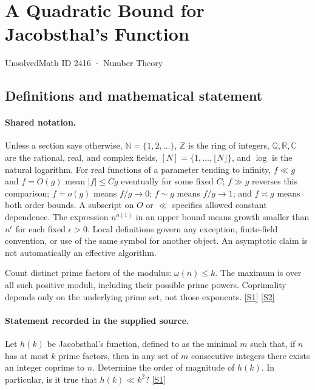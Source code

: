\documentclass[11pt,a4paper]{article}
\newcommand{\N}{\mathbb{N}}
\newcommand{\Z}{\mathbb{Z}}
\newcommand{\Q}{\mathbb{Q}}
\newcommand{\R}{\mathbb{R}}
\newcommand{\C}{\mathbb{C}}
\newcommand{\sref}[2]{\hyperlink{source:#1:#2}{[S#2]}}
\begin{document}

\setcounter{section}{2415}

\section{A Quadratic Bound for Jacobsthal's Function}\label{2416}

{\small\sffamily UnsolvedMath ID 2416 · Number Theory}

\subsection{Definitions and mathematical statement}

\paragraph{Shared notation.}Unless a section says otherwise, $\N=\{1,2,\ldots\}$,
$\Z$ is the ring of integers, $\Q,\R,\C$ are the rational, real, and complex
fields, $[N]=\{1,\ldots,\lfloor N\rfloor\}$, and $\log$ is the natural
logarithm. For real functions of a parameter tending to infinity,
$f\ll g$ and $f=O(g)$ mean $|f|\leq Cg$ eventually for some fixed $C$;
$f\gg g$ reverses this comparison; $f=o(g)$ means $f/g\to0$;
$f\sim g$ means $f/g\to1$; and $f\asymp g$ means both order bounds.
A subscript on $O$ or $\ll$ specifies allowed constant dependence.
The expression $n^{o(1)}$ in an upper bound means growth smaller than
$n^\epsilon$ for each fixed $\epsilon>0$. Local definitions govern any
exception, finite-field convention, or use of the same symbol for another
object. An asymptotic claim is not automatically an effective algorithm.



Count distinct prime factors of the modulus: $\omega(n)\leq k$. The maximum is over all such positive moduli, including their possible prime powers. Coprimality depends only on the underlying prime set, not those exponents. \sref{2416}{1} \sref{2416}{2}

\paragraph{Statement recorded in the supplied source.}
Let $h(k)$ be Jacobsthal's function, defined to as the minimal $m$ such that, if $n$ has at most $k$ prime factors, then in any set of $m$ consecutive integers there exists an integer coprime to $n$. Determine the order of magnitude of $h(k)$. In particular, is it true that $ h(k) \ll k^2? $ \sref{2416}{1}
\end{document}
